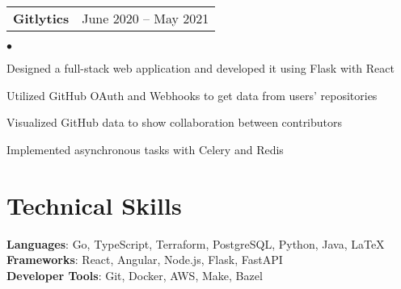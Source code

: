 \documentclass[margin, 11pt]{res}
\makeatletter
\newcommand{\resumeSubSubheading}[2]{
\begin{tabular*}{1.01\textwidth}{@{\hspace{-4pt}}l @{\extracolsep{\fill}} r}
    #1 & #2 
\end{tabular*}\vspace{-7pt}
}
\newenvironment{list2}{
	\begin{list}{$\bullet$}{%
	    \small
		\setlength{\itemsep}{0in}
		\setlength{\parsep}{0in} \setlength{\parskip}{0in}
		\setlength{\topsep}{0in} \setlength{\partopsep}{0in}
		\setlength{\leftmargin}{0.2in}}}{\end{list}}
\makeatother
\begin{document}
\begin{resume}
\resumeSubSubheading{\textbf{Gitlytics}}{June 2020 -- May 2021}

\begin{list2}
\item{Designed a full-stack web application and developed it using Flask with React}
\item{Utilized GitHub OAuth and Webhooks to get data from users' repositories}
\item{Visualized GitHub data to show collaboration between contributors}
\item{Implemented asynchronous tasks with Celery and Redis}
\end{list2}


\section{\sc Technical Skills}

\textbf{Languages}{: Go, TypeScript, Terraform, PostgreSQL, Python, Java, \LaTeX} \\
\textbf{Frameworks}{: React, Angular, Node.js, Flask, FastAPI} \\
\textbf{Developer Tools}{: Git, Docker, AWS, Make, Bazel} \\


\vspace{0.2in}

\end{resume}
\end{document}
